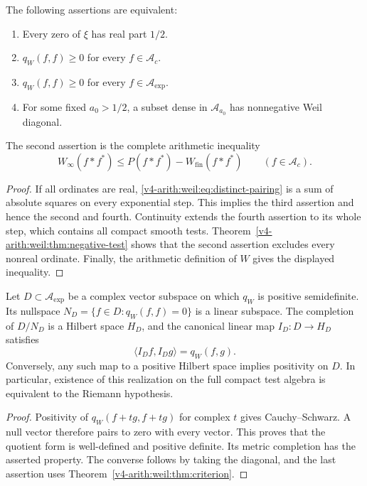 \begin{theorem}
\label{v4-arith:weil:thm:criterion}
The following assertions are equivalent:
\begin{enumerate}
 \item Every zero of \(\xi\) has real part \(1/2\).
 \item \(q_W(f,f)\ge0\) for every \(f\in\mathscr A_c\).
 \item \(q_W(f,f)\ge0\) for every \(f\in\mathscr A_{\exp}\).
 \item For some fixed \(a_0>1/2\), a subset dense in
       \(\mathscr A_{a_0}\) has nonnegative Weil diagonal.
\end{enumerate}
The second assertion is the complete arithmetic inequality
\begin{equation}
 W_\infty(f*f^*)\le P(f*f^*)-W_{\mathrm{fin}}(f*f^*)
                \qquad(f\in\mathscr A_c).
 \label{v4-arith:weil:eq:complete-inequality}
\end{equation}
\end{theorem}
\begin{proof}
If all ordinates are real, \eqref{v4-arith:weil:eq:distinct-pairing}
is a sum of absolute squares on every exponential step.
This implies the third assertion and hence the second and fourth.
Continuity extends the fourth assertion to its whole step, which
contains all compact smooth tests. Theorem~\ref{v4-arith:weil:thm:negative-test}
shows that the second assertion excludes every nonreal ordinate.
Finally, the arithmetic definition of \(W\) gives the displayed inequality.
\end{proof}

\begin{proposition}
\label{v4-arith:weil:prop:hilbert}
Let \(D\subset\mathscr A_{\exp}\) be a complex vector subspace on
which \(q_W\) is positive semidefinite. Its nullspace
\(N_D=\{f\in D:q_W(f,f)=0\}\) is a linear subspace.
The completion of \(D/N_D\) is a Hilbert space \(H_D\), and the
canonical linear map \(I_D:D\to H_D\) satisfies
\[
 \langle I_Df,I_Dg\rangle=q_W(f,g).
\]
Conversely, any such map to a positive Hilbert space implies positivity
on \(D\). In particular, existence of this realization on the full
compact test algebra is equivalent to the Riemann hypothesis.
\end{proposition}
\begin{proof}
Positivity of \(q_W(f+tg,f+tg)\) for complex \(t\) gives
Cauchy--Schwarz. A null vector therefore pairs to zero with every
vector. This proves that the quotient form is well-defined and positive
definite. Its metric completion has the asserted property.
The converse follows by taking the diagonal, and the last assertion
uses Theorem~\ref{v4-arith:weil:thm:criterion}.
\end{proof}

